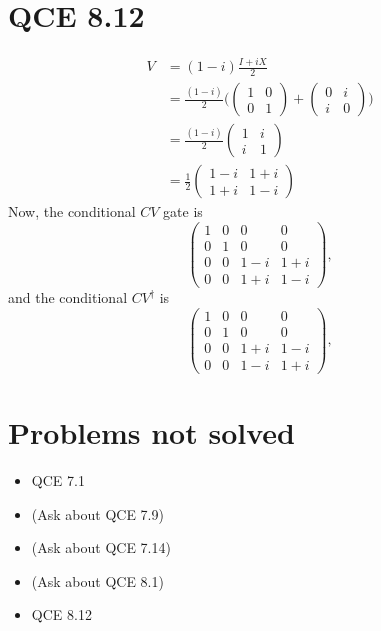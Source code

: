 \documentclass[10pt]{article}
\begin{document}
\section*{QCE 8.12}
\begin{align*}
V &= (1 - i) \frac{I + iX}{2} \\
   &= \frac{(1 - i)}{2} 
\Bigg( 
\begin{pmatrix}
 1 & 0 \\
 0 & 1  
\end{pmatrix}    
+
\begin{pmatrix}
0 & i \\
i & 0
\end{pmatrix}
\Bigg) \\
&= 
\frac{(1-i)}{2} 
\begin{pmatrix}
1 & i \\
i & 1
\end{pmatrix} \\
&= 
\frac{1}{2}
\begin{pmatrix}
1 - i & 1 + i \\
1 + i & 1 - i
\end{pmatrix}
\end{align*}
Now, the conditional $CV$ gate is 
\[
\begin{pmatrix}
1 & 0 & 0 & 0 \\
0 & 1 & 0 & 0 \\
0 & 0 & 1 - i & 1 + i \\
0 & 0 & 1 + i & 1 - i 
\end{pmatrix},
\]
and the conditional $CV^{\dag}$ is
\[
\begin{pmatrix}
1 & 0 & 0 & 0 \\
0 & 1 & 0 & 0 \\
0 & 0 & 1 + i & 1 - i \\
0 & 0 & 1 - i & 1 + i 
\end{pmatrix},
\]

\section*{Problems not solved}
\begin{itemize}
\item QCE 7.1 
\item (Ask about QCE 7.9)
\item (Ask about QCE 7.14)
\item (Ask about QCE 8.1)
\item QCE 8.12
\end{itemize}
\end{document}
